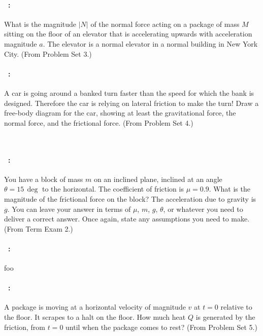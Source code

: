 \documentclass[12pt]{article} 
\begin{document}
\paragraph{\problemname~\theproblem:}%
What is the magnitude $|N|$ of the normal force acting on a package of
mass $M$ sitting on the floor of an elevator that is accelerating
upwards with acceleration magnitude $a$. The elevator is a normal
elevator in a normal building in New York City.
(From Problem Set 3.)

\vfill

\paragraph{\problemname~\theproblem:}%
A car is going around a banked turn faster than the speed for which
the bank is designed. Therefore the car is relying on lateral friction
to make the turn!  Draw a free-body diagram for the car, showing at
least the gravitational force, the normal force, and the frictional
force.
(From Problem Set 4.)

\vfill
~
\clearpage

\paragraph{\problemname~\theproblem:}%
You have a block of mass $m$ on an inclined plane, inclined at an
angle $\theta=15\,\deg$ to the horizontal. The coefficient of friction
is $\mu=0.9$. What is the magnitude of the frictional force on the
block? The acceleration due to gravity is $g$.
You can leave your answer in terms of $\mu$, $m$, $g$, $\theta$, or
whatever you need to deliver a correct answer.
Once again, state any assumptions you need to make.
(From Term Exam 2.)

\vfill

\paragraph{\problemname~\theproblem:}%
foo

\vfill

\paragraph{\problemname~\theproblem:}%
A package is moving at a horizontal velocity of magnitude $v$ at $t=0$
relative to the floor.  It scrapes to a halt on the floor. How much
heat $Q$ is generated by the friction, from $t=0$ until when the
package comes to rest?
(From Problem Set 5.)
\end{document}
